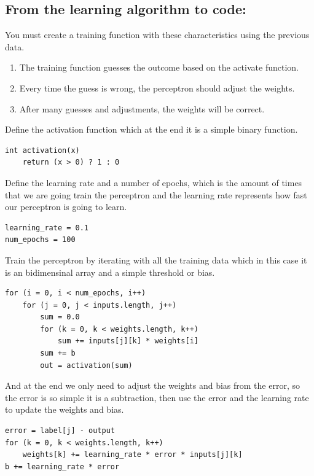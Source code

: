 \documentclass[12pt]{article}
\begin{document}
\subsection{From the learning algorithm to code:}
You must create a training function with these characteristics using the previous data.
\begin{enumerate}
\item The training function guesses the outcome based on the activate function.
\item Every time the guess is wrong, the perceptron should adjust the weights.
\item After many guesses and adjustments, the weights will be correct.
\end{enumerate}
Define the activation function which at the end it is a simple binary function.
\begin{verbatim}
int activation(x)
    return (x > 0) ? 1 : 0
\end{verbatim}
Define the learning rate and a number of epochs, which is the amount of times that we are going
train the perceptron and the learning rate represents how fast our perceptron is going to learn.
\begin{verbatim}
learning_rate = 0.1
num_epochs = 100
\end{verbatim}
Train the perceptron by iterating with all the training data which in this case it is an bidimensinal
array and a simple threshold or bias.
\begin{verbatim}
for (i = 0, i < num_epochs, i++)
    for (j = 0, j < inputs.length, j++)
        sum = 0.0
        for (k = 0, k < weights.length, k++)
            sum += inputs[j][k] * weights[i]
        sum += b
        out = activation(sum)
\end{verbatim}
And at the end we only need to adjust the weights and bias from the error, so the error is so simple
it is  a subtraction, then use the error and the learning rate to update the weights and bias.
\begin{verbatim}
error = label[j] - output
for (k = 0, k < weights.length, k++)
    weights[k] += learning_rate * error * inputs[j][k]
b += learning_rate * error
\end{verbatim}
\end{document}
